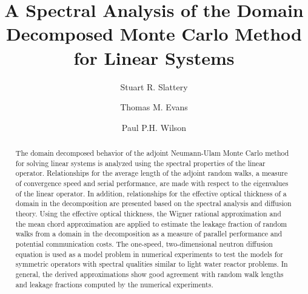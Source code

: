 \documentclass[preprint,11pt]{elsarticle}
\begin{document}
\begin{frontmatter}

  \title{A Spectral Analysis of the Domain Decomposed Monte Carlo Method for
    Linear Systems}


  \author[ornl]{Stuart R. Slattery}


  \author[ornl]{Thomas M. Evans}


  \author[wisc]{Paul P.H. Wilson}


  \address[ornl]{Oak Ridge National Laboratory, 1 Bethel Valley Rd., Oak
    Ridge, TN 37831, U.S.A.}

  \address[wisc]{University of Wisconsin - Madison, 1500 Engineering Dr.,
    Madison, WI 53706, U.S.A.}

  \begin{abstract}
    The domain decomposed behavior of the adjoint Neumann-Ulam Monte Carlo
    method for solving linear systems is analyzed using the spectral
    properties of the linear operator. Relationships for the average length of
    the adjoint random walks, a measure of convergence speed and serial
    performance, are made with respect to the eigenvalues of the linear
    operator. In addition, relationships for the effective optical thickness
    of a domain in the decomposition are presented based on the spectral
    analysis and diffusion theory. Using the effective optical thickness, the
    Wigner rational approximation and the mean chord approximation are applied
    to estimate the leakage fraction of random walks from a domain in the
    decomposition as a measure of parallel performance and potential
    communication costs. The one-speed, two-dimensional neutron diffusion
    equation is used as a model problem in numerical experiments to test the
    models for symmetric operators with spectral qualities similar to light
    water reactor problems. In general, the derived approximations show good
    agreement with random walk lengths and leakage fractions computed by the
    numerical experiments.
  \end{abstract}


\end{frontmatter}
\end{document}
